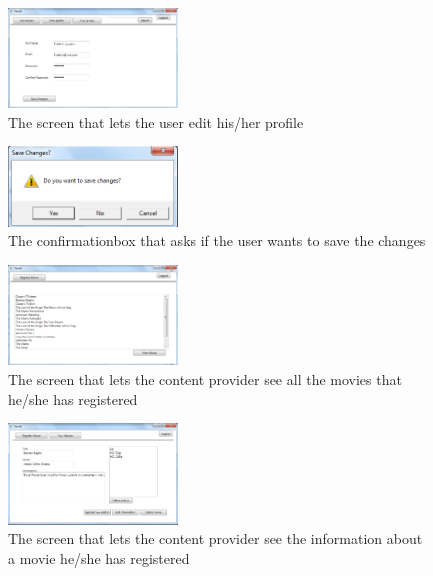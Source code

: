\begin{figure}[h!]
  \centering
    \includegraphics[width=0.4\textwidth]{Parts/Appendix/Images/Editprofile}
  \caption{The screen that lets the user edit his/her profile}
  \label{fig:Appendix_GUI_PrototypeEditprofile}
\end{figure}
\begin{figure}[h!]
  \centering
    \includegraphics[width=0.4\textwidth]{Parts/Appendix/Images/Confirmationbox}
  \caption{The confirmationbox that asks if the user wants to save the changes}
  \label{fig:Appendix_GUI_PrototypeEditprofile}
\end{figure}
\begin{figure}[h!]
  \centering
    \includegraphics[width=0.4\textwidth]{Parts/Appendix/Images/CPmovielist}
  \caption{The screen that lets the content provider see all the movies that he/she has registered}
  \label{fig:Appendix_GUI_PrototypeCPMovielist}
\end{figure}
\begin{figure}[h!]
  \centering
    \includegraphics[width=0.4\textwidth]{Parts/Appendix/Images/CPViewmovie}
  \caption{The screen that lets the content provider see the information about a movie he/she has registered}
  \label{fig:Appendix_GUI_PrototypeCPViewmovie}
\end{figure}
